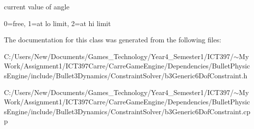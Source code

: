 current value of angle 

0=free, 1=at lo limit, 2=at hi limit 

The documentation for this class was generated from the following files:\begin{CompactItemize}
\item 
C:/Users/New/Documents/Games\_\-Technology/Year4\_\-Semester1/ICT397/$\sim$My Work/Assignment1/ICT397Carre/CarreGameEngine/Dependencies/BulletPhysicsEngine/include/Bullet3Dynamics/ConstraintSolver/b3Generic6DofConstraint.h\item 
C:/Users/New/Documents/Games\_\-Technology/Year4\_\-Semester1/ICT397/$\sim$My Work/Assignment1/ICT397Carre/CarreGameEngine/Dependencies/BulletPhysicsEngine/include/Bullet3Dynamics/ConstraintSolver/b3Generic6DofConstraint.cpp\end{CompactItemize}
